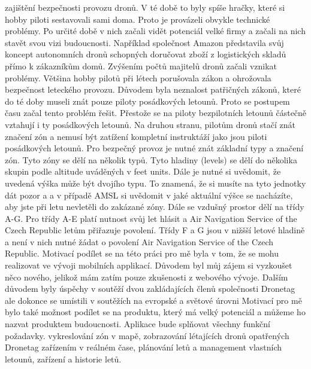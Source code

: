 zajištění bezpečnosti provozu dronů.
V té době to byly spíše hračky, které si hobby piloti sestavovali sami doma.
Proto je provázeli obvykle technické problémy.
Po určité době v nich začali vidět potenciál velké firmy a začali na nich stavět svou vizi budoucnosti.
Například společnost Amazon představila svůj koncept autonomních dronů schopných doručovat zboží z logistických skladů přímo k zákazníkům domů.
Zvýšením počtů majitelů dronů začali vznikat problémy.
Většina hobby pilotů při létech porušovala zákon a ohrožovala bezpečnost leteckého provozu.
Důvodem byla neznalost patřičných zákonů, které do té doby museli znát pouze piloty posádkových letounů.
Proto se postupem času začal tento problém řešit.
Přestože se na piloty bezpilotních letounů částečně vztahují i ty posádkových letounů.
Na druhou stranu, pilotům dronů stačí znát značení zón  a nemusí být zatížení kompletní instruktáží jako jsou piloti posádkových letounů.
Pro bezpečný provoz je nutné znát základní typy a značení zón.
Tyto zóny se dělí na několik typů.
Tyto hladiny (levels) se dělí do několika skupin podle altitude uváděných v feet units.
Dále je nutné si uvědomit, že uvedená výška může být dvojího typu.
To znamená, že si musíte na tyto jednotky dát pozor a a v případě AMSL si uvědomit v jaké aktuální výšce se nacházíte, aby jste při letu nevletěli do zakázané zóny.
Dále se vzdušný prostor dělí na třídy A-G.
Pro třídy A-E platí nutnost svůj let hlásit a Air Navigation Service of the Czech Republic letům přiřazuje povolení.
Třídy F a G jsou v nižšší letové hladině a není v nich nutné žádat o povolení Air Navigation Service of the Czech Republic.
Motivací podílet se na této práci pro mě byla v tom, že se mohu realizovat ve vývoji mobilních applikací.
Důvodem byl můj zájem si vyzkoušet něco nového, jelikož mám zatím pouze zkušenosti z webového vývoje.
Dalším důvodem byly úspěchy v soutěží dvou zakládajících členů společnosti Dronetag
ale dokonce se umístili v soutěžích na evropské a světové úrovni
Motivací pro mě bylo také možnost podílet se na produktu, který má velký potenciál a můžeme ho nazvat produktem budoucnosti.
Aplikace bude splňovat všechny funkční požadavky.
vykreslování zón v mapě, zobrazování létajících dronů opatřených Dronetag zařízením v reálném čase, plánování letů a management vlastních letounů, zařízení a historie letů.
